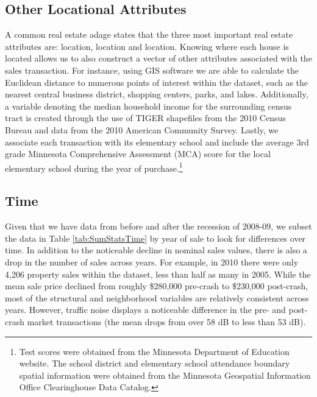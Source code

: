 \documentclass{article}\usepackage{graphicx, color}
\begin{document}
\subsection{Other Locational Attributes}
A common real estate adage states that the three most important real estate attributes are: location, location and location. Knowing where each house is located allows us to also construct a vector of other attributes associated with the sales transaction. For instance, using GIS software we are able to calculate the Euclidean distance to numerous points of interest within the dataset, such as the nearest central business district, shopping centers, parks, and lakes. Additionally, a variable denoting the median household income for the surrounding census tract is created through the use of TIGER shapefiles from the 2010 Census Bureau and data from the 2010 American Community Survey. Lastly, we associate each transaction with its elementary school and include the average 3rd grade Minnesota Comprehensive Assessment (MCA) score for the local elementary school during the year of purchase.\footnote{Test scores were obtained from the Minnesota Department of Education website. The school district and elementary school attendance boundary spatial information were obtained from the Minnesota Geospatial Information Office Clearinghouse Data Catalog.} 

\subsection{Time}
Given that we have data from before and after the recession of 2008-09, we subset the data in Table \ref{tab:SumStatsTime} by year of sale to look for differences over time. In addition to the noticeable decline in nominal sales values, there is also a drop in the number of sales across years. For example, in 2010 there were only 4,206 property sales within the dataset, less than half as many in 2005. While the mean sale price declined from roughly \$280,000 pre-crash to \$230,000 post-crash, most of the structural and neighborhood variables are relatively consistent across years. However, traffic noise displays a noticeable difference in the pre- and post-crash market transactions (the mean drops from over 58 dB to less than 53 dB). 
\end{document}
